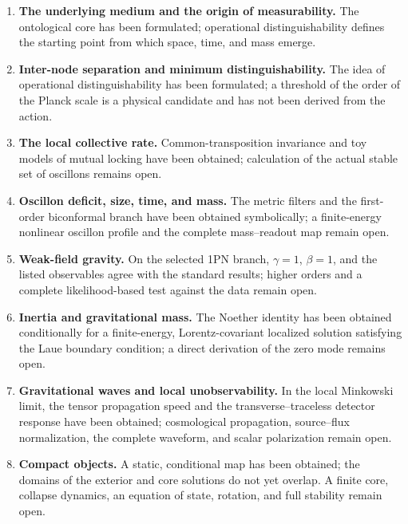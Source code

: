 \documentclass[11pt,a4paper]{article}
\begin{document}
\begin{enumerate}
\item \textbf{The underlying medium and the origin of measurability.} The ontological core has been formulated; operational distinguishability defines the starting point from which space, time, and mass emerge.

\item \textbf{Inter-node separation and minimum distinguishability.} The idea of operational distinguishability has been formulated; a threshold of the order of the Planck scale is a physical candidate and has not been derived from the action.

\item \textbf{The local collective rate.} Common-transposition invariance and toy models of mutual locking have been obtained; calculation of the actual stable set of oscillons remains open.

\item \textbf{Oscillon deficit, size, time, and mass.} The metric filters and the first-order biconformal branch have been obtained symbolically; a finite-energy nonlinear oscillon profile and the complete mass--readout map remain open.

\item \textbf{Weak-field gravity.} On the selected 1PN branch, $\gamma=1$, $\beta=1$, and the listed observables agree with the standard results; higher orders and a complete likelihood-based test against the data remain open.

\item \textbf{Inertia and gravitational mass.} The Noether identity has been obtained conditionally for a finite-energy, Lorentz-covariant localized solution satisfying the Laue boundary condition; a direct derivation of the zero mode remains open.

\item \textbf{Gravitational waves and local unobservability.} In the local Minkowski limit, the tensor propagation speed and the transverse--traceless detector response have been obtained; cosmological propagation, source--flux normalization, the complete waveform, and scalar polarization remain open.

\item \textbf{Compact objects.} A static, conditional map has been obtained; the domains of the exterior and core solutions do not yet overlap. A finite core, collapse dynamics, an equation of state, rotation, and full stability remain open.


\end{enumerate}
\end{document}
